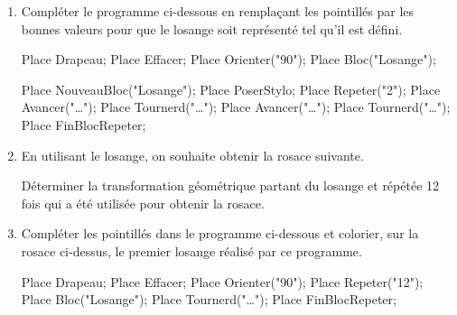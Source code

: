 \begin{exercice*}
    \begin{enumerate}
        \item Compléter le programme ci-dessous en remplaçant les pointillés par les bonnes valeurs pour que le losange soit représenté tel qu'il est défini.\\
        \begin{Scratch}[Echelle=0.7]
            Place Drapeau;
            Place Effacer;
            Place Orienter("90");
            Place Bloc("Losange");
        \end{Scratch}
        \hspace*{10mm}
        \begin{Scratch}[Echelle=0.7]
            Place NouveauBloc("Losange");
            Place PoserStylo;
            Place Repeter("2");
            Place Avancer("\dots");
            Place Tournerd("\dots");
            Place Avancer("\dots");
            Place Tournerd("\dots");
            Place FinBlocRepeter;        
        \end{Scratch}    
        \item En utilisant le losange, on souhaite obtenir la rosace suivante.\\
        \begin{minipage}{0.6\linewidth}
            Déterminer la transformation géométrique partant du losange et répétée \num{12} fois qui a été utilisée pour obtenir la rosace.    
        \end{minipage}
        \begin{minipage}{0.4\linewidth}
            \begin{Geometrie}[CoinHD={(4u,4u)}]        
                \enonceTroisiemeGTroisExoQuatorze
            \end{Geometrie}   
        \end{minipage}        
        \item Compléter les pointillés dans le programme ci-dessous et colorier, sur la rosace ci-dessus, le premier losange réalisé par ce programme.\\
        \begin{Scratch}[Echelle=0.7]
            Place Drapeau;
            Place Effacer;
            Place Orienter("90");
            Place Repeter("12");
            Place Bloc("Losange");
            Place Tournerd("\dots");
            Place FinBlocRepeter;
        \end{Scratch}
    \end{enumerate}   
\end{exercice*}
